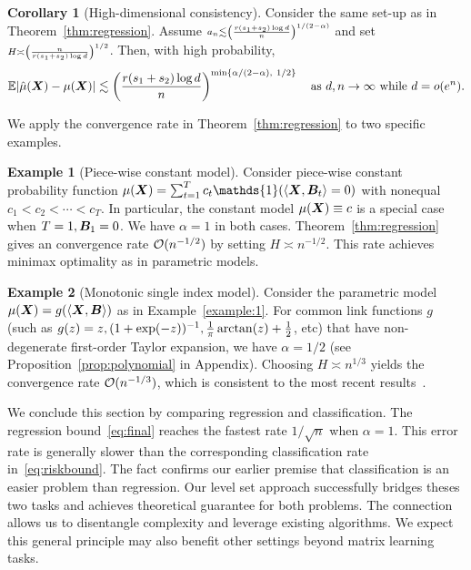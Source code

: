 \documentclass[11pt]{article}
\theoremstyle{plain}
\theoremstyle{definition}
\newtheorem{corollary}{Corollary}
\newtheorem{example}{Example}
\begin{document}
\begin{corollary}[High-dimensional consistency] Consider the same set-up as in Theorem~\ref{thm:regression}. Assume $\scriptstyle a_n \lesssim \left({r(s_1+s_2)\log d \over n}\right)^{1/(2-\alpha)}$ and set $\scriptstyle H\asymp \left({n\over r(s_1+s_2) \log d}\right)^{1/2}$. Then, with high probability,
\begin{equation}\label{eq:final}
\mathbb{E}|\hat \mu(\bm X)- \mu(\bm X)| \lesssim \left({r(s_1+s_2)\log d \over n}\right)^{\min\{\alpha/(2-\alpha),\ 1/2\}} \quad \text{as }d, n\to\infty \text{ while } d=o(e^{n}).
\end{equation}
\end{corollary}
We apply the convergence rate in Theorem~\ref{thm:regression} to two specific examples.

\begin{example}[Piece-wise constant model] Consider piece-wise constant probability function $\mu(\mX)=\sum_{t=1}^T c_t\mathds{1}(\langle \mX, \mB_t \rangle=0)$ with nonequal $c_1< c_2<\cdots < c_T$. In particular, the constant model $\mu(\bm X)\equiv c$ is a special case when $T=1, \bm B_1 = 0$.  We have $\alpha=1$ in both cases. Theorem~\ref{thm:regression} gives an convergence rate $\mathcal{O}(n^{-1/2})$ by setting $H\asymp n^{-1/2}$. This rate achieves minimax optimality as in parametric models. 
\end{example}

\begin{example}[Monotonic single index model]
Consider the parametric model $\mu(\bm X)=g(\langle \bm X,\bm B \rangle)$ as in Example~\ref{example:1}. For common link functions $g$ (such as $g(z)=z, (1+\exp(-z))^{-1}, {1\over \pi}\arctan(z)+{1\over 2}$, etc) that have non-degenerate first-order Taylor expansion, we have $\alpha=1/2$ (see Proposition~\ref{prop:polynomial} in Appendix). Choosing $H\asymp n^{1/3}$ yields the convergence rate $\mathcal{O}(n^{-1/3})$, which is consistent to the most recent results~\citep{balabdaoui2019least}. 
\end{example}

We conclude this section by comparing regression and classification. The regression bound~\eqref{eq:final} reaches the fastest rate $1/\sqrt{n}$ when $\alpha=1$. This error rate is generally slower than the corresponding classification rate in~\eqref{eq:riskbound}. The fact confirms our earlier premise that classification is an easier problem than regression. Our level set approach successfully bridges theses two tasks and achieves theoretical guarantee for both problems. The connection allows us to disentangle complexity and leverage existing algorithms. We expect this general principle may also benefit other settings beyond matrix learning tasks.  
\end{document}
